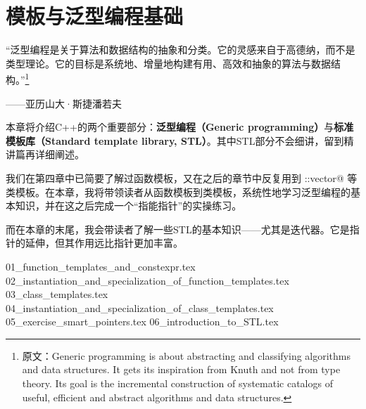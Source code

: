 \chapter{模板与泛型编程基础}
{\kaishu \large ``泛型编程是关于算法和数据结构的抽象和分类。它的灵感来自于高德纳，而不是类型理论。它的目标是系统地、增量地构建有用、高效和抽象的算法与数据结构。''\footnote{原文：Generic programming is about abstracting and classifying algorithms and data structures. It gets its inspiration from Knuth and not from type theory. Its goal is the incremental construction of systematic catalogs of useful, efficient and abstract algorithms and data structures.}}
\begin{flushright}——亚历山大·斯捷潘若夫\end{flushright}\par
本章将介绍C++的两个重要部分：\textbf{泛型编程（Generic programming）}与\textbf{标准模板库（Standard template library, STL）}。其中STL部分不会细讲，留到精讲篇再详细阐述。\par
我们在第四章中已简要了解过函数模板，又在之后的章节中反复用到 \lstinline@std::vector@ 等类模板。在本章，我将带领读者从函数模板到类模板，系统性地学习泛型编程的基本知识，并在这之后完成一个``指能指针''的实操练习。\par
而在本章的末尾，我会带读者了解一些STL的基本知识——尤其是迭代器。它是指针的延伸，但其作用远比指针更加丰富。\par
{01_function_templates_and_constexpr.tex}
{02_instantiation_and_specialization_of_function_templates.tex}
{03_class_templates.tex}
{04_instantiation_and_specialization_of_class_templates.tex}
{05_exercise_smart_pointers.tex}
{06_introduction_to_STL.tex}